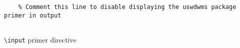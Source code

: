 \begin{listing}[H]
  \captionsetup{skip=\skiplistingcaptionlen}
  \begin{verbatim}
    % Comment this line to disable displaying the uswdwms package primer in output
    
  \end{verbatim}
  \caption{\texttt{\textbackslash input} primer directive}
  \label{primer:lst:installation_and_usage:inputprimer}
\end{listing}

